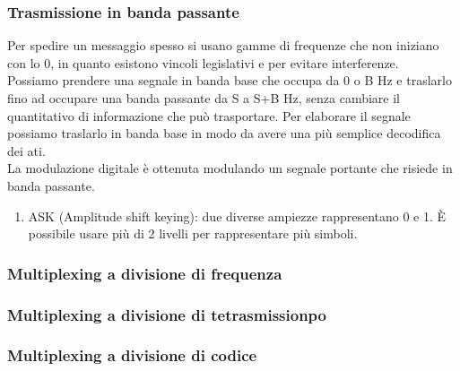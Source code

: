 \documentclass{article}
\begin{document}
		\subsubsection{Trasmissione in banda passante}
		Per spedire un messaggio spesso si usano gamme di frequenze che non iniziano con lo 0, in quanto esistono vincoli legislativi e per evitare interferenze.\\
		Possiamo prendere una segnale in banda base che occupa da 0 o B Hz e traslarlo fino ad occupare una banda passante da S a S+B Hz, senza cambiare il quantitativo di informazione che può trasportare. Per elaborare il segnale possiamo traslarlo in banda base in modo da avere una più semplice decodifica dei ati.\\
		La modulazione digitale è ottenuta modulando un segnale portante che risiede in banda passante. 
		\begin{enumerate}
			\item ASK (Amplitude shift keying): due diverse ampiezze rappresentano 0 e 1. È possibile usare più di 2 livelli per rappresentare più simboli.
		\end{enumerate}
		
		\subsubsection{Multiplexing  a divisione di frequenza}
		\subsubsection{Multiplexing  a divisione di tetrasmissionpo}
		\subsubsection{Multiplexing  a divisione di codice}
\end{document}
